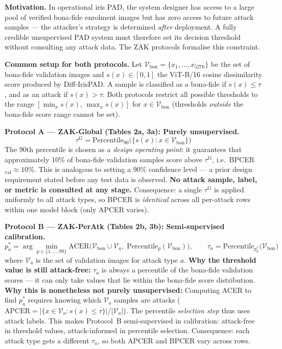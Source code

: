 \documentclass{article}
\begin{document}
\begin{tcolorbox}[
  colback=zakblue!60,
  colframe=blue!50!black,
  title={\textbf{ZAK Protocol Definition and Justification}},
  fonttitle=\small\bfseries,
  fontupper=\small
]

\textbf{Motivation.}
In operational iris PAD, the system designer has access to a large pool of
verified bona-fide enrolment images but has zero access to future attack
samples — the attacker's strategy is determined \emph{after} deployment.
A fully credible unsupervised PAD system must therefore set its
decision threshold without consulting any attack data.
The ZAK protocols formalise this constraint.

\medskip
\textbf{Common setup for both protocols.}
Let $\mathcal{V}_{\mathrm{bon}} = \{x_1,\ldots,x_{5276}\}$ be the set of
bona-fide validation images and $s(x) \in [0,1]$ the ViT-B/16 cosine
dissimilarity score produced by Diff-IrisPAD.
A sample is classified as a bona-fide if $s(x) \le \tau$, and as an attack
if $s(x) > \tau$.
Both protocols restrict all possible thresholds to the range
$[\min_x s(x),\,\max_x s(x)]$ for $x \in \mathcal{V}_{\mathrm{bon}}$
(thresholds \emph{outside} the bona-fide score range cannot be set).

\medskip
\textbf{Protocol A — ZAK-Global (Tables 2a, 3a): Purely unsupervised.}
\[
  \tau^{\mathrm{G}} = \mathrm{Percentile}_{90}\!\bigl(\{s(x):x\in\mathcal{V}_{\mathrm{bon}}\}\bigr)
\]
The 90th percentile is chosen as a \emph{design operating point}: it
guarantees that approximately 10\% of bona-fide validation samples score
above $\tau^{\mathrm{G}}$, i.e.\ BPCER$_{\mathrm{val}}\approx 10\%$.
This is analogous to setting a 90\% confidence level — a prior design
requirement stated before any test data is observed.
\textbf{No attack sample, label, or metric is consulted at any stage.}
Consequence: a single $\tau^{\mathrm{G}}$ is applied uniformly to all
attack types, so BPCER is \emph{identical} across all per-attack rows
within one model block (only APCER varies).

\medskip
\textbf{Protocol B — ZAK-PerAtk (Tables 2b, 3b): Semi-supervised calibration.}
\[
  p_a^* = \arg\min_{p \in \{1,\ldots,99\}}
    \mathrm{ACER}\!\bigl(\mathcal{V}_{\mathrm{bon}} \cup \mathcal{V}_a,\;
    \mathrm{Percentile}_p(\mathcal{V}_{\mathrm{bon}})\bigr),
  \qquad
  \tau_a = \mathrm{Percentile}_{p_a^*}\!\bigl(\mathcal{V}_{\mathrm{bon}}\bigr)
\]
where $\mathcal{V}_a$ is the set of validation images for attack type $a$.
\textbf{Why the threshold value is still attack-free:}
$\tau_a$ is always a percentile of the bona-fide validation scores —
it can only take values that lie within the bona-fide score distribution.
\textbf{Why this is nonetheless not purely unsupervised:}
Computing ACER to find $p_a^*$ requires knowing which $\mathcal{V}_a$
samples are attacks ($\mathrm{APCER} = |\{x \in \mathcal{V}_a : s(x)\le\tau\}|/|\mathcal{V}_a|$).
The percentile \emph{selection step} thus uses attack labels.
This makes Protocol~B semi-supervised in calibration:
attack-free in threshold values, attack-informed in percentile selection.
Consequence: each attack type gets a different $\tau_a$, so both APCER and
BPCER vary across rows.


\end{tcolorbox}
\end{document}
